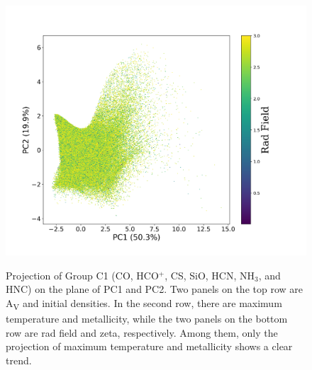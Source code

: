\documentclass{aa}
\begin{document}
\begin{CJK*}{UTF8}{gbsn}
\begin{figure}[htbp]
{        \includegraphics[scale = 0.27]{7/PC1&2_radfield.png}
        }
        \caption{Projection of Group C1 (CO, HCO$^+$, CS, SiO, HCN, NH$_3$, and HNC) on the plane of PC1 and PC2. Two panels on the top row are A\textsubscript{V} and initial densities. In the second row, there are maximum temperature and metallicity, while the two panels on the bottom row are rad field and zeta, respectively. Among them, only the projection of maximum temperature and metallicity shows a clear trend.}
        \label{C1-12}
    \end{figure}
 

\end{CJK*}
\end{document}
